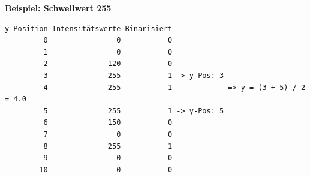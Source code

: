\documentclass[a4paper,10pt]{scrartcl}
\begin{document}
\bigskip
\begin{minipage}{\textwidth} 
\textbf{Beispiel: Schwellwert 255}

\begin{minipage}{0.95\textwidth}
\begin{verbatim}
y-Position Intensitätswerte Binarisiert
         0                0           0
         1                0           0
         2              120           0
         3              255           1 -> y-Pos: 3
         4              255           1             => y = (3 + 5) / 2 = 4.0
         5              255           1 -> y-Pos: 5
         6              150           0
         7                0           0
         8              255           1
         9                0           0
        10                0           0
\end{verbatim}
\end{minipage}\begin{minipage}{0.04\textwidth}

\end{minipage}
\end{minipage}
\end{document}
